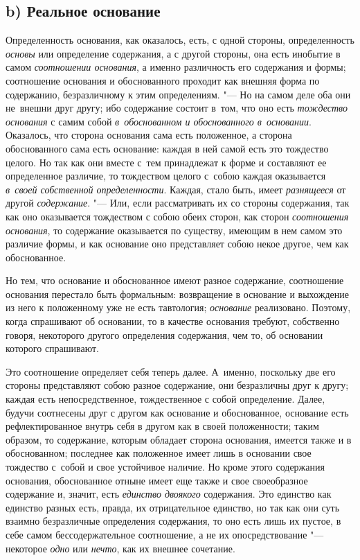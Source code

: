 \subsection[b) Реальное основание]{b) Реальное основание}

Определенность основания, как оказалось, есть, с одной стороны, определенность
{\em основы} или определение содержания, а с другой стороны, она есть инобытие
в самом {\em соотношении основания}, а именно различность его содержания и
формы; соотношение основания и обоснованного проходит как внешняя форма по
содержанию, безразличному к этим определениям. "--- Но на самом
деле оба они не~внешни друг другу; ибо содержание состоит
в~том, что оно есть {\em тождество основания} с самим собой
{\em в~обоснованном и обоснованного в~основании}. Оказалось, что сторона
основания сама есть положенное, а сторона обоснованного сама есть основание:
каждая в ней самой есть это тождество целого. Но так как они вместе с~тем
принадлежат к форме и составляют ее определенное различие, то тождеством целого
с~собою каждая оказывается {\em в~своей собственной
определенности}. Каждая, стало быть,
имеет {\em разнящееся} от другой {\em содержание}. "--- Или, если рассматривать
их со стороны содержания, так как оно оказывается тождеством с собою обеих
сторон, как сторон {\em соотношения основания}, то содержание оказывается по
существу, имеющим в нем самом это различие формы, и как основание оно
представляет собою некое другое, чем как обоснованное.

Но тем, что основание и обоснованное имеют разное содержание, соотношение
основания перестало быть формальным: возвращение в основание и выхождение из
него к положенному уже не есть тавтология; {\em основание} реализовано.
Поэтому, когда спрашивают об основании, то в качестве основания требуют,
собственно говоря, некоторого другого определения содержания, чем то, об
основании которого спрашивают.

Это соотношение определяет себя теперь далее. А~именно, поскольку две его
стороны представляют собою разное содержание, они безразличны друг к другу;
каждая есть непосредственное, тождественное с собой определение. Далее, будучи
соотнесены друг с другом как основание и обоснованное, основание есть
рефлектированное внутрь себя в другом как в своей положенности; таким образом,
то содержание, которым обладает сторона основания, имеется также и в
обоснованном; последнее как положенное имеет лишь в основании свое тождество
с~собой и свое устойчивое наличие. Но кроме этого содержания основания,
обоснованное отныне имеет еще также и свое своеобразное содержание и, значит,
есть {\em единство двоякого} содержания. Это единство как единство разных есть,
правда, их отрицательное единство, но так как они суть взаимно безразличные
определения содержания, то оно есть лишь их пустое, в себе самом
бессодержательное соотношение, а не их опосредствование "--- некоторое
{\em одно} или {\em нечто}, как их внешнее сочетание.


